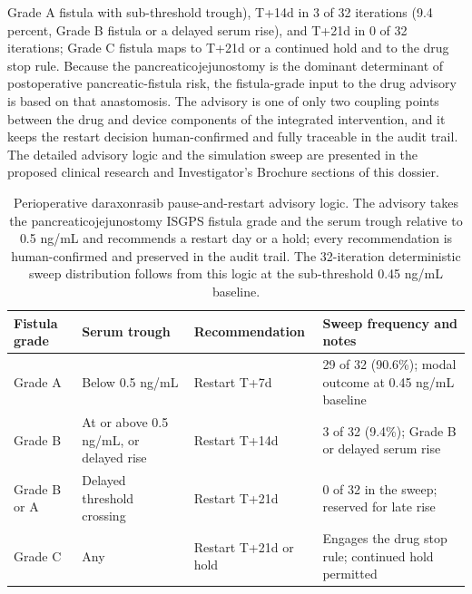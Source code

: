 Grade A fistula with sub-threshold trough), T+14d in 3 of
32 iterations (9.4 percent, Grade B fistula or a delayed serum rise), and T+21d in 0
of 32 iterations; Grade C fistula maps to T+21d or a continued hold and to the drug
stop rule. Because the pancreaticojejunostomy is the dominant determinant of
postoperative pancreatic-fistula risk, the fistula-grade input to the drug advisory
is based on that anastomosis. The advisory is one of only two coupling points
between the drug and device components of the integrated intervention, and it keeps
the restart decision human-confirmed and fully traceable in the audit trail. The
detailed advisory logic and the simulation sweep are presented in the proposed
clinical research and Investigator's Brochure sections of this dossier.

\clearpage

\begin{table}[t]
\caption{Perioperative daraxonrasib pause-and-restart advisory logic. The advisory
takes the pancreaticojejunostomy ISGPS fistula grade and the serum trough relative
to 0.5 ng/mL and recommends a restart day or a hold; every recommendation is
human-confirmed and preserved in the audit trail. The 32-iteration deterministic
sweep distribution follows from this logic at the sub-threshold 0.45 ng/mL baseline.}
\label{tab:sec02-restart}
\centering
\begin{tabularx}{\textwidth}{L{2.6cm} L{3.4cm} L{2.6cm} Y}
\toprule
\textbf{Fistula grade} & \textbf{Serum trough} & \textbf{Recommendation} & \textbf{Sweep frequency and notes} \\
\midrule
Grade A & Below 0.5 ng/mL & Restart T+7d & 29 of 32 (90.6\%); modal outcome at 0.45 ng/mL baseline \\
Grade B & At or above 0.5 ng/mL, or delayed rise & Restart T+14d & 3 of 32 (9.4\%); Grade B or delayed serum rise \\
Grade B or A & Delayed threshold crossing & Restart T+21d & 0 of 32 in the sweep; reserved for late rise \\
Grade C & Any & Restart T+21d or hold & Engages the drug stop rule; continued hold permitted \\
\bottomrule
\end{tabularx}
\end{table}
\vspace*{-1.4cm}

